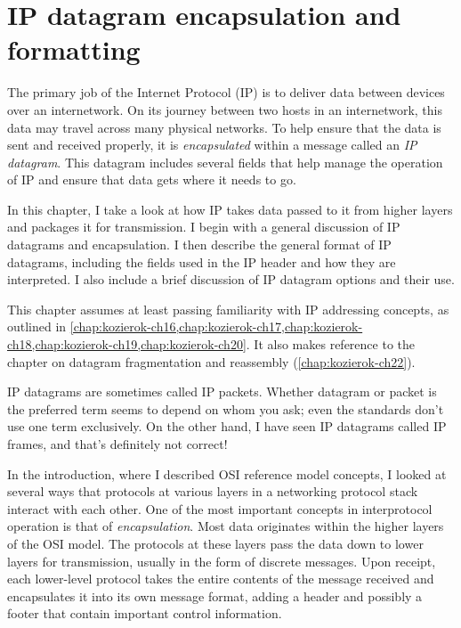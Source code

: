\chapter{IP datagram encapsulation and formatting}
\label{chap:kozierok-ch21}


The primary job of the Internet Protocol (IP) is to deliver data between
devices over an internetwork. On its journey between two hosts in an
internetwork, this data may travel across many physical networks. To
help ensure that the data is sent and received properly, it is
\emph{encapsulated} within a message called an \emph{IP datagram}.
This datagram includes several fields that help manage the operation of
IP and ensure that data gets where it needs to go.

In this chapter, I take a look at how IP takes data passed to it from
higher layers and packages it for transmission. I begin with a general
discussion of IP datagrams and encapsulation. I then describe the
general format of IP datagrams, including the fields used in the IP
header and how they are interpreted.
I also include a brief discussion of IP datagram options and their use.


\begin{backgroundinfo}
This chapter assumes at least passing familiarity with IP addressing concepts, as outlined in
\cref{chap:kozierok-ch16,chap:kozierok-ch17,chap:kozierok-ch18,chap:kozierok-ch19,chap:kozierok-ch20}.
It also makes reference to the chapter on datagram fragmentation and reassembly (\cref{chap:kozierok-ch22}).
\end{backgroundinfo}


\begin{note}
IP datagrams are sometimes called IP packets.
Whether datagram or packet is the preferred term seems to depend on whom you ask; even the standards don't use one term exclusively.
On the other hand, I have seen IP datagrams called IP frames, and that's definitely not correct!
\end{note}


In the introduction, where I described
OSI reference model concepts, I looked at several ways that protocols at various
layers in a networking protocol stack interact with each other.
One of the most important concepts in interprotocol operation is that of \emph{encapsulation}.
Most data originates within the higher layers of the OSI model.
The protocols at these layers pass the data down to lower layers for transmission, usually in the form of discrete messages.
Upon receipt, each lower-level protocol takes the entire contents of the message received and encapsulates it into its own message format, adding
a header and possibly a footer that contain important control information.

